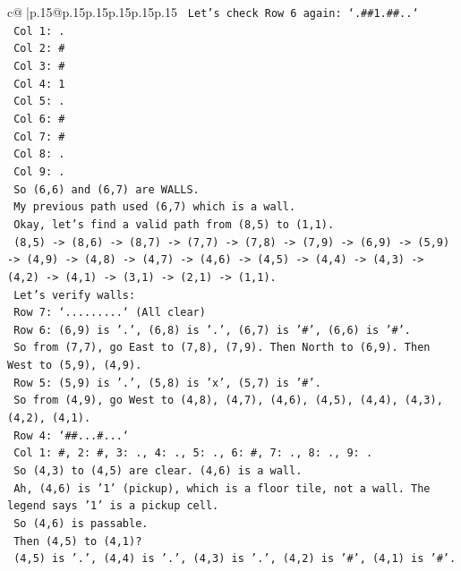 \documentclass{article}
\begin{document}
{\begin{supertabular}{c@{$\;$}|p{.15\linewidth}@{}p{.15\linewidth}p{.15\linewidth}p{.15\linewidth}p{.15\linewidth}p{.15\linewidth}}
{{{\texttt{   Let's check Row 6 again: `.\#\#1.\#\#..`} \\
\texttt{   Col 1: .} \\
\texttt{   Col 2: \#} \\
\texttt{   Col 3: \#} \\
\texttt{   Col 4: 1} \\
\texttt{   Col 5: .} \\
\texttt{   Col 6: \#} \\
\texttt{   Col 7: \#} \\
\texttt{   Col 8: .} \\
\texttt{   Col 9: .} \\
\texttt{   So (6,6) and (6,7) are WALLS.} \\
\texttt{   My previous path used (6,7) which is a wall.} \\
\texttt{   Okay, let's find a valid path from (8,5) to (1,1).} \\
\texttt{   (8,5) {-}> (8,6) {-}> (8,7) {-}> (7,7) {-}> (7,8) {-}> (7,9) {-}> (6,9) {-}> (5,9) {-}> (4,9) {-}> (4,8) {-}> (4,7) {-}> (4,6) {-}> (4,5) {-}> (4,4) {-}> (4,3) {-}> (4,2) {-}> (4,1) {-}> (3,1) {-}> (2,1) {-}> (1,1).} \\
\texttt{   Let's verify walls:} \\
\texttt{   Row 7: `.........` (All clear)} \\
\texttt{   Row 6: (6,9) is '.', (6,8) is '.', (6,7) is '\#', (6,6) is '\#'.} \\
\texttt{   So from (7,7), go East to (7,8), (7,9). Then North to (6,9). Then West to (5,9), (4,9).} \\
\texttt{   Row 5: (5,9) is '.', (5,8) is 'x', (5,7) is '\#'.} \\
\texttt{   So from (4,9), go West to (4,8), (4,7), (4,6), (4,5), (4,4), (4,3), (4,2), (4,1).} \\
\texttt{   Row 4: `\#\#...\#...`} \\
\texttt{   Col 1: \#, 2: \#, 3: ., 4: ., 5: ., 6: \#, 7: ., 8: ., 9: .} \\
\texttt{   So (4,3) to (4,5) are clear. (4,6) is a wall.} \\
\texttt{   Ah, (4,6) is '1' (pickup), which is a floor tile, not a wall. The legend says '1' is a pickup cell.} \\
\texttt{   So (4,6) is passable.} \\
\texttt{   Then (4,5) to (4,1)?} \\
\texttt{   (4,5) is '.', (4,4) is '.', (4,3) is '.', (4,2) is '\#', (4,1) is '\#'.} \\
}}}
\end{supertabular}}
\end{document}
